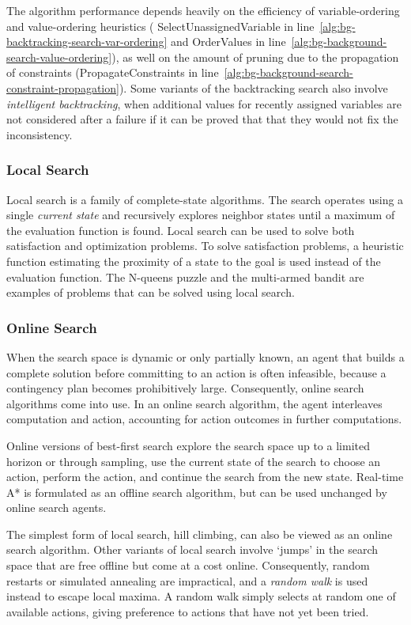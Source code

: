 The algorithm performance depends heavily on the efficiency of
variable-ordering and value-ordering heuristics ({\sc
  SelectUnassignedVariable} in
line~\ref{alg:bg-backtracking-search-var-ordering}
and {\sc  OrderValues} in
line~\ref{alg:bg-background-search-value-ordering}), as well on the
amount of pruning due to the propagation of constraints
({\sc PropagateConstraints} in line~\ref{alg:bg-background-search-constraint-propagation}). Some
variants of the backtracking search also involve {\em intelligent
  backtracking}, when additional values for recently assigned
variables are not considered after a failure if it can be proved
that that they would not fix the inconsistency.

\subsubsection{Local Search}

Local search is a family of complete-state algorithms. The search
operates using a single {\em current state} and recursively explores
neighbor states until a maximum of the evaluation function is
found. Local search can be used to solve both satisfaction and
optimization problems. To solve satisfaction problems, a heuristic
function estimating the proximity of a state to the goal is used instead
of the evaluation function. The N-queens puzzle and the multi-armed
bandit are examples of problems that can be solved using local search.

\subsubsection{Online Search}

When the search space is dynamic or only partially known, an agent
that builds a complete solution before committing to an action is
often infeasible, because a contingency plan becomes prohibitively
large. Consequently, online search algorithms come into use. In an
online search algorithm, the agent interleaves computation and action,
accounting for action outcomes in further computations.

Online versions of best-first search explore the search space up to a
limited horizon or through sampling, use the current state
of the search to choose an action, perform the action, and continue
the search from the new state. Real-time A* is formulated as an offline
search algorithm, but can be used unchanged by online search agents.

The simplest form of local search, hill climbing, can also be
viewed as an online search algorithm. Other variants of local search
involve `jumps' in the search space that are free offline but come at
a cost online. Consequently, random restarts or simulated annealing
are impractical, and a {\em random walk} is used instead to escape
local maxima. A random walk simply selects at random one of available
actions, giving preference to actions that have not yet been tried.

